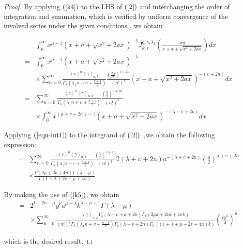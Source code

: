 \documentclass{amsart}
\theoremstyle{plain}
\numberwithin{equation}{section}
\begin{document}
\begin{proof}
By applying $\left( \ref{k4}\right) $ to the LHS of $\left( \ref{2}\right) $
and interchanging the order of integration and summation, which is verified
by uniform convergence of the involved series under the given conditions ,
we obtain

\begin{eqnarray*}
&&\int_{0}^{\infty }x^{\mu -1}\left( x+a+\sqrt{x^{2}+2ax}\right) ^{-\lambda
}J_{k,\upsilon }^{c,\gamma ,\lambda _{1}}\left( \frac{xy}{x+a+\sqrt{x^{2}+2ax}}\right) dx \\
&=&\int_{0}^{\infty }x^{\mu -1}\left( x+a+\sqrt{x^{2}+2ax}\right) ^{-\lambda
} \\
&&\times \sum_{n=0}^{\infty }\frac{\left( c\right) ^{n}\left( \gamma \right)
_{n,k}}{\Gamma _{k}\left( \lambda _{1}n+\upsilon +\frac{b+1}{2}\right) }\frac{\left( \frac{xy}{2}\right) ^{\upsilon +2n}}{\left( n!\right) ^{2}}\left( x+a+\sqrt{x^{2}+2ax}\right) ^{-\left( \upsilon +2n\right) }dx \\
&=&\sum_{n=0}^{\infty }\frac{\left( c\right) ^{n}\left( \gamma \right) _{n,k}}{\Gamma _{k}\left( \lambda _{1}n+\upsilon +\frac{b+1}{2}\right) }\frac{\left( \frac{y}{2}\right) ^{\upsilon +2n}}{\left( n!\right) ^{2}} \\
&&\times \int_{0}^{\infty }x^{\left( \mu +\upsilon +2n\right) -1}\left( x+a+\sqrt{x^{2}+2ax}\right) ^{-\left( \lambda +\upsilon +2n\right) }dx
\end{eqnarray*}

Applying $\left( \ref{eqn-int1}\right) $ to the integrand of $\left( \ref{2}\right) $\ ,we obtain the following expression:\begin{eqnarray*}
&=&\sum_{n=0}^{\infty }\frac{\left( c\right) ^{n}\left( \gamma \right) _{n,k}}{\Gamma _{k}\left( \lambda _{1}n+\upsilon +\frac{b+1}{2}\right) }\frac{\left( \frac{y}{2}\right) ^{\upsilon +2n}}{\left( n!\right) ^{2}}2\left(
\lambda +\upsilon +2n\right) a^{-\left( \lambda +\upsilon +2n\right) }\left( 
\frac{a}{2}\right) ^{\mu +\upsilon +2n} \\
&&\times \frac{\Gamma \left( 2\mu +2\nu +4n\right) \Gamma \left( \lambda
-\mu \right) }{\Gamma \left( 1+\lambda +2\nu +\mu +4n\right) }
\end{eqnarray*}

By making the use of $\left( \ref{k5}\right) $, we obtain\begin{eqnarray*}
&=&2^{1-2\nu -\mu }y^{\nu }a^{\mu -\lambda }k^{\lambda -\mu +1}\Gamma \left(
\lambda -\mu \right)  \\
&&\times \sum_{k-0}^{\infty }\frac{\left( \gamma \right) _{n,k}\Gamma
_{k}\left( \lambda +\nu +k+2n\right) \Gamma _{k}\left( 2\mu k+2\nu
k+4nk\right) }{\left( n!\right) ^{2}\Gamma _{k}\left( \lambda _{1}n+\upsilon
+\frac{b+1}{2}\right) \Gamma _{k}\left( \lambda +\nu +2n\right) \Gamma
_{k}\left( \left( 1+\lambda +\mu +2\upsilon +4n\right) k\right) }\left( 
\frac{cy^{2}}{4}\right) ^{n}
\end{eqnarray*}

which is the desired result.
\end{proof}
\end{document}
